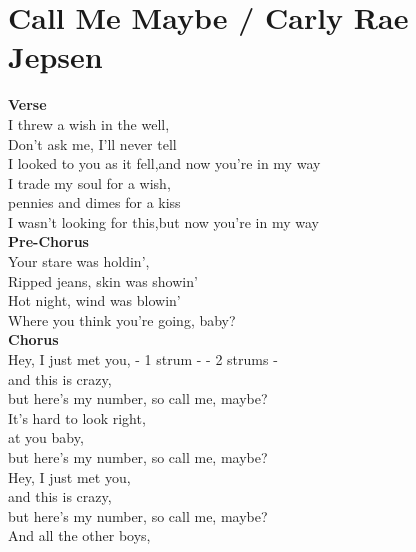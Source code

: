 \section{Call Me Maybe / Carly Rae Jepsen}\label{sec:callmemaybe}

\Aminor
\Cmajor
\Fmajor
\Gmajor

\textbf{Verse}\\
I threw a wish in the well,\\
Don't ask me, I'll never tell\\
I looked to you as it fell,and now you're in my way\\
I trade my soul for a wish,\\
pennies and dimes for a kiss        \\       
I wasn't looking for this,but now you're in my way\\
\textbf{Pre-Chorus}\\
Your stare was holdin',\\
Ripped jeans, skin was showin'\\
Hot night, wind was blowin'\\
Where you think you're going, baby?\\
\textbf{Chorus}                \\
Hey, I just met you,  - 1 strum -   - 2 strums -      \\             
and this is crazy,                  \\       
but here's my number,   so call me, maybe?\\
It's hard to look right,       \\        
at you baby,                        \\ 
but here's my number,   so call me, maybe?\\
Hey, I just met you,      \\                
and this is crazy,                     \\    
but here's my number,    so call me, maybe?\\
And all the other boys,     \\               
